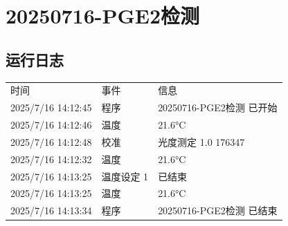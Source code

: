 \documentclass[UTF8,10pt,a4paper,fontset=fandol]{ctexart}
\newcommand{\fieldvalue}[1]{#1}
\begin{document}
\newpage

\section*{20250716-PGE2检测}

\subsection*{运行日志}

\begin{tabularx}{\textwidth}{@{}l l X@{}}
时间 & 事件 & 信息 \\
\fieldvalue{2025/7/16 14:12:45} &
\fieldvalue{程序} &
\fieldvalue{20250716-PGE2检测 已开始} \\

\fieldvalue{2025/7/16 14:12:46} &
\fieldvalue{温度} &
\fieldvalue{21.6°C} \\

\fieldvalue{2025/7/16 14:12:48} &
\fieldvalue{校准} &
\fieldvalue{光度测定 1.0 176347} \\

\fieldvalue{2025/7/16 14:12:32} &
\fieldvalue{温度} &
\fieldvalue{21.6°C} \\

\fieldvalue{2025/7/16 14:13:25} &
\fieldvalue{温度设定 1} &
\fieldvalue{已结束} \\

\fieldvalue{2025/7/16 14:13:25} &
\fieldvalue{温度} &
\fieldvalue{21.6°C} \\

\fieldvalue{2025/7/16 14:13:34} &
\fieldvalue{程序} &
\fieldvalue{20250716-PGE2检测 已结束}
\end{tabularx}
\end{document}
